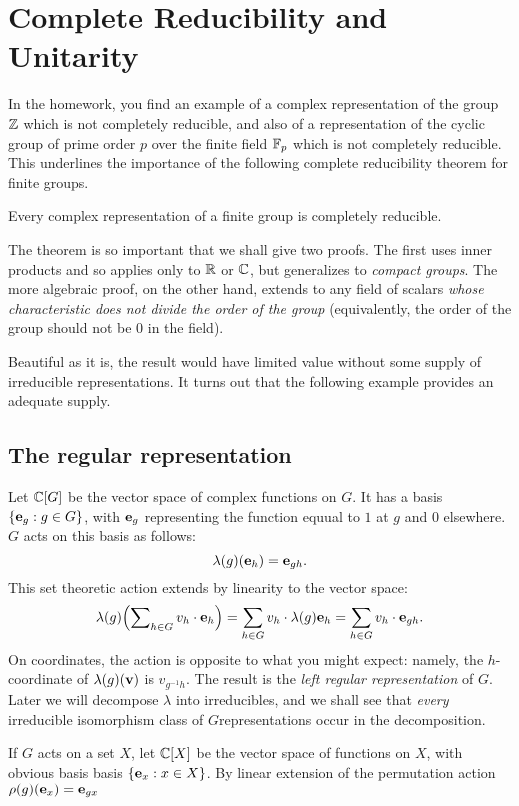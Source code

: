 \chapter{Complete Reducibility and Unitarity}
In the homework, you find an example of a complex representation of the
group \(\mathbb{Z}\) which is not completely reducible, and also of a
representation of the cyclic group of prime order \(p\) over the finite
field \(\mathbb{F}_p\) which is not completely reducible. This underlines the
importance of the following complete reducibility theorem for finite
groups.

\begin{theorem}
  Every complex representation of a finite group is completely reducible.
\end{theorem}

The theorem is so important that we shall give two proofs. The first uses
inner products and so applies only to \(\mathbb{R}\) or \(\mathbb{C}\), but generalizes
to \emph{compact groups}. The more algebraic proof, on the other hand,
extends to any field of scalars \emph{whose characteristic does not divide
  the order of the group} (equivalently, the order of the group should not
be \(0\) in the field).

Beautiful as it is, the result would have limited value without some supply
of irreducible representations. It turns out that the following example
provides an adequate supply.

\section{The regular representation}
Let \(\mathbb{C}[G]\) be the vector space of complex functions on \(G\). It has a
basis \(\{\mathbf{e}_g:g\in G\}\), with \(\mathbf{e}_g\) representing the function
equual to \(1\) at \(g\) and \(0\) elsewhere. \(G\) acts on this basis as
follows:
\[
  \lambda(g)(\mathbf{e}_h)=\mathbf{e}_{gh}.
\]
This set theoretic action extends by linearity to the vector space:
\[
  \lambda(g)\Bigl(\sum\nolimits_{h\in G} v_h\cdot\mathbf{e}_h\Bigr)
  =\sum_{h\in G}v_h\cdot\lambda(g)\mathbf{e}_h
  =\sum_{h\in G}v_h\cdot\mathbf{e}_{gh}.
\]
On coordinates, the action is opposite to what you might expect: namely,
the \(h\)-coordinate of \(\lambda(g)(\mathbf{v})\) is \(v_{g^{-1}h}\). The result
is the \emph{left regular representation} of \(G\). Later we will decompose
\(\lambda\) into irreducibles, and we shall see that \emph{every}
irreducible isomorphism class of \(G\)representations occur in the
decomposition.

\begin{remark}
  If \(G\) acts on a set \(X\), let \(\mathbb{C}[X]\) be the vector space of
  functions on \(X\), with obvious basis basis \(\{\mathbf{e}_x:x\in X\}\). By
  linear extension of the permutation action \(\rho(g)(\mathbf{e}_x)=\mathbf{e}_{gx}\)
\end{remark}

